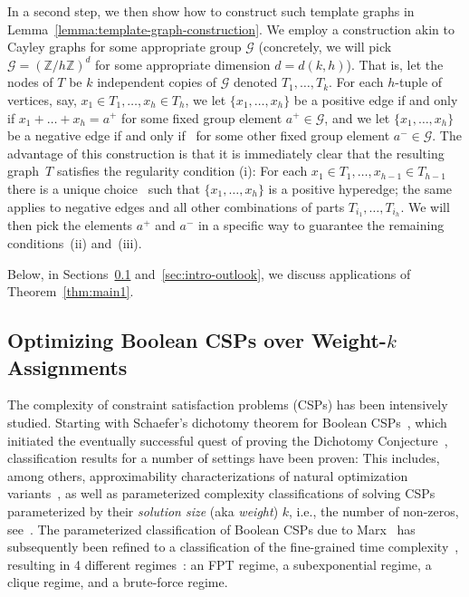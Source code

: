 \documentclass[a4paper,UKenglish,cleveref, autoref, thm-restate,numberwithinsect]{lipics-v2021}
\begin{document}
In a second step, we then show how to construct such template graphs in Lemma~\ref{lemma:template-graph-construction}. We employ a construction akin to Cayley graphs for some appropriate group $\mathcal G$ (concretely, we will pick $\mathcal G = (\mathbb{Z} / h \mathbb{Z})^d$ for some appropriate dimension $d = d(k, h)$). That is, let the nodes of $T$ be $k$ independent copies of $\mathcal G$ denoted $T_1, \dots, T_k$. For each $h$-tuple of vertices, say, $x_1 \in T_1, \dots, x_h \in T_h$, we let $\{x_1, \dots, x_h\}$ be a positive edge if and only if $x_1 + \dots + x_h = a^+$ for some fixed group element $a^+ \in \mathcal G$, and we let $\{x_1, \dots, x_h\}$ be a negative edge if and only if~ for some other fixed group element $a^- \in \mathcal G$. The advantage of this construction is that it is immediately clear that the resulting graph~$T$ satisfies the regularity condition (i): For each $x_1 \in T_1, \dots, x_{h-1} \in T_{h-1}$ there is a unique choice~ such that $\{x_1, \dots, x_h\}$ is a positive hyperedge; the same applies to negative edges and all other combinations of parts $T_{i_1}, \dots, T_{i_h}$. We will then pick the elements $a^+$ and $a^-$ in a specific way to guarantee the remaining conditions~(ii) and~(iii). 

\medskip
Below, in Sections~\ref{sec:intro-optCSPs} and~\ref{sec:intro-outlook}, we discuss applications of Theorem~\ref{thm:main1}.

\subsection{Optimizing Boolean CSPs over Weight-\texorpdfstring{\boldmath$k$}{k} Assignments}
\label{sec:intro-optCSPs}
The complexity of constraint satisfaction problems (CSPs) has been intensively studied. Starting with Schaefer's dichotomy theorem for Boolean CSPs~\cite{Schaefer78}, which initiated the eventually successful quest of proving the Dichotomy Conjecture~\cite{Bulatov17,Zhuk17,Zhuk20}, classification results for a number of settings have been proven: This includes, among others, approximability characterizations of natural optimization variants~\cite{Creignou95, KhannaSTW00}, as well as parameterized complexity classifications of solving CSPs parameterized by their \emph{solution size} (aka \emph{weight}) $k$, i.e., the number of non-zeros, see~\cite{Marx05, BulatovM14, KratschMW16}. The parameterized classification of Boolean CSPs due to Marx~\cite{Marx05} has subsequently been refined to a classification of the fine-grained time complexity~, resulting in 4 different regimes~\cite{KunnemannM20}: an FPT regime, a subexponential regime, a clique regime, and a brute-force regime.
\end{document}
